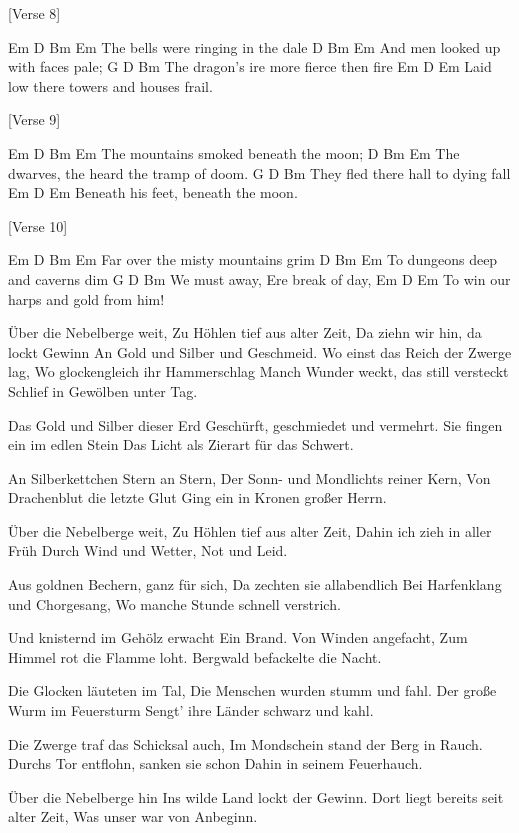[Verse 8]

  Em           D    Bm      Em
The bells were ringing in the dale
             D       Bm     Em
And men looked up with faces pale;
           G           D         Bm
The dragon's ire more fierce then fire
               Em        D      Em
Laid low there towers and houses frail.


[Verse 9]

              Em     D     Bm  Em
The mountains smoked beneath the moon;
                D         Bm      Em
The dwarves, the heard the tramp of doom.
               G      D     Bm
They fled there hall to dying fall
           Em     D          Em
Beneath his feet, beneath the moon.


[Verse 10]

   Em        D      Bm      Em
Far over the misty mountains grim
           D        Bm     Em
To dungeons deep and caverns dim
       G         D       Bm
We must away, Ere break of day,
          Em        D        Em
To win our harps and gold from him!


Über die Nebelberge weit,
Zu Höhlen tief aus alter Zeit,
Da ziehn wir hin, da lockt Gewinn
An Gold und Silber und Geschmeid.
Wo einst das Reich der Zwerge lag,
Wo glockengleich ihr Hammerschlag
Manch Wunder weckt, das still versteckt
Schlief in Gewölben unter Tag.

Das Gold und Silber dieser Erd
Geschürft, geschmiedet und vermehrt.
Sie fingen ein im edlen Stein
Das Licht als Zierart für das Schwert.

An Silberkettchen Stern an Stern,
Der Sonn- und Mondlichts reiner Kern,
Von Drachenblut die letzte Glut
Ging ein in Kronen großer Herrn.

Über die Nebelberge weit,
Zu Höhlen tief aus alter Zeit,
Dahin ich zieh in aller Früh
Durch Wind und Wetter, Not und Leid.

Aus goldnen Bechern, ganz für sich,
Da zechten sie allabendlich
Bei Harfenklang und Chorgesang,
Wo manche Stunde schnell verstrich.

Und knisternd im Gehölz erwacht
Ein Brand. Von Winden angefacht,
Zum Himmel rot die Flamme loht.
Bergwald befackelte die Nacht.

Die Glocken läuteten im Tal,
Die Menschen wurden stumm und fahl.
Der große Wurm im Feuersturm
Sengt’ ihre Länder schwarz und kahl.

Die Zwerge traf das Schicksal auch,
Im Mondschein stand der Berg in Rauch.
Durchs Tor entflohn, sanken sie schon
Dahin in seinem Feuerhauch.

Über die Nebelberge hin
Ins wilde Land lockt der Gewinn.
Dort liegt bereits seit alter Zeit,
Was unser war von Anbeginn.
